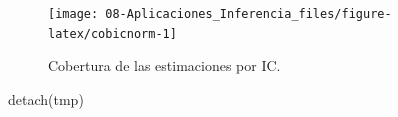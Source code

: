 \documentclass[
]{book}
\newenvironment{Shaded}{\begin{snugshade}}{\end{snugshade}}
\newcommand{\FunctionTok}[1]{\textcolor[rgb]{0.00,0.00,0.00}{#1}}
\newcommand{\NormalTok}[1]{#1}
\theoremstyle{break}
\theoremstyle{definition}
\theoremstyle{definition}
\theoremstyle{definition}
\theoremstyle{definition}
\theoremstyle{remark}
\begin{document}
\begin{enumerate}
  \begin{figure}[!htb]

  {\centering \texttt{[image: 08-Aplicaciones\_Inferencia\_files/figure-latex/cobicnorm-1]} 

  }

  \caption{Cobertura de las estimaciones por IC.}\label{fig:cobicnorm}
  \end{figure}

\begin{Shaded}
\begin{Highlighting}[]
\FunctionTok{detach}\NormalTok{(tmp)}
\end{Highlighting}
\end{Shaded}
\end{enumerate}

\vspace{0.5cm}
\end{document}
